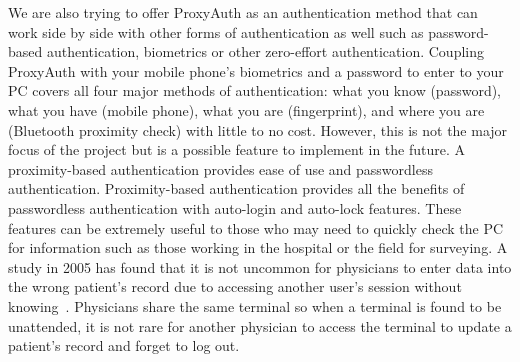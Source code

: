 \documentclass[letterpaper,twocolumn,10pt]{article}
\begin{document}
We are also trying to offer ProxyAuth as an authentication method that can work side by side with other forms of authentication as well such as password-based authentication, biometrics or other zero-effort authentication. Coupling ProxyAuth with your mobile phone's biometrics and a password to enter to your PC covers all four major methods of authentication: what you know (password), what you have (mobile phone), what you are (fingerprint), and where you are (Bluetooth proximity check) with little to no cost. However, this is not the major focus of the project but is a possible feature to implement in the future. A proximity-based authentication provides ease of use and passwordless authentication. Proximity-based authentication provides all the benefits of passwordless authentication with auto-login and auto-lock features. These features can be extremely useful to those who may need to quickly check the PC for information such as those working in the hospital or the field for surveying. A study in 2005 has found that it is not uncommon for physicians to enter data into the wrong patient's record due to accessing another user's session without knowing~\cite{paper_medical}. Physicians share the same terminal so when a terminal is found to be unattended, it is not rare for another physician to access the terminal to update a patient's record and forget to log out.
\end{document}
